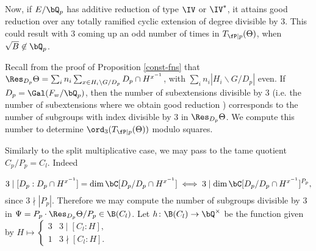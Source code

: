 Now, if $E /\bQ_p$ has additive reduction of type $\IV$ or $\IV^*$, it attains good reduction over any totally ramified cyclic extension of degree divisible by $3$. This could result with $3$ coming up an odd number of times in $T_{\fP \mid p}(\Theta)$, when $\sqrt{B} \not\in \bQ_p$. 


Recall from the proof of Proposition \ref{const-fns} that $\Res_{D_p} \Theta = \sum_i n_i \sum_{x \in H_i \backslash G / D_p} D_p \cap H^{x^{-1}}$, with $\sum_i n_i | H_i \backslash G / D_p|$ even. If $D_p = \Gal(F_w / \bQ_p)$, then the number of subextensions divisible by $3$ (i.e. the number of subextensions where we obtain good reduction ) corresponds to the number of subgroups with index divisible by $3$ in $\Res_{D_p}\Theta$. We compute this number to determine $\ord_3(T_{\fP \mid p}(\Theta))$ modulo squares.

Similarly to the split multiplicative case, we may pass to the tame quotient $C_p / P_p = C_l$. Indeed 

\[ 3 \mid  [D_p : D_p \cap H^{x^{-1}}] = \dim \bC [ D_p / D_p \cap H^{x^{-1}}] \iff 3 \mid \dim \bC[ D_p / D_p \cap H^{x^{-1}} ]^{P_p},\] 
since $3 \nmid|P_p|$. Therefore we may compute the number of subgroups divisible by $3$ in $\Psi = P_p \cdot \Res_{D_p} \Theta / P_p \in \B(C_l)$.  Let $h \colon \B(C_l) \to \bQ^{\times}$ be the function given by $H \mapsto \begin{cases} 3 & 3 \mid [C_l : H], \\ 1 & 3 \nmid [C_l : H]. \end{cases}$

